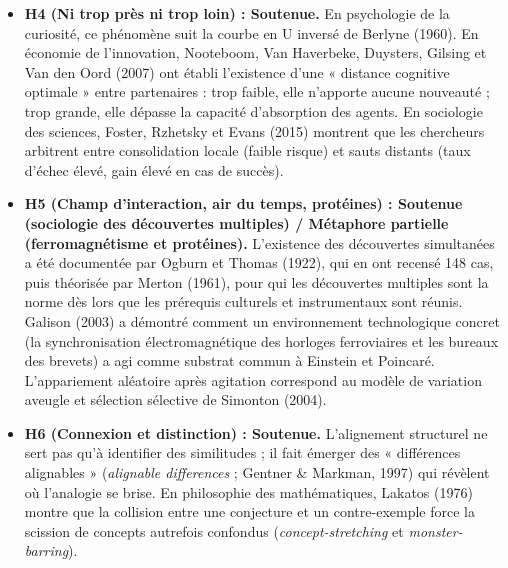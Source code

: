 \documentclass[a4paper,11pt]{article}
\begin{document}
\begin{itemize}
  l'invocation du théorème de Noether et d'un lagrangien est une
  métaphore non opératoire : le théorème de Noether relie les symétries
  continues (groupes de Lie) d'une fonctionnelle d'action différentiable
  \(\mathcal{S} = \int L(q, \dot{q}, t)\,dt\) à des courants conservés.
  Or, un réseau de concepts est discret, orienté et dépourvu de
  dynamique hamiltonienne ou lagrangienne canonique. L'équivalent
  mathématique rigoureux est l'\textbf{homomorphisme de graphes typés}
  (ou l'équivariance d'opérateurs discrets).
\item
  \textbf{H4 (Ni trop près ni trop loin) : Soutenue.} En psychologie de
  la curiosité, ce phénomène suit la courbe en U inversé de Berlyne
  (1960). En économie de l'innovation, Nooteboom, Van Haverbeke,
  Duysters, Gilsing et Van den Oord (2007) ont établi l'existence d'une
  « distance cognitive optimale » entre partenaires : trop faible, elle
  n'apporte aucune nouveauté ; trop grande, elle dépasse la capacité
  d'absorption des agents. En sociologie des sciences, Foster, Rzhetsky
  et Evans (2015) montrent que les chercheurs arbitrent entre
  consolidation locale (faible risque) et sauts distants (taux d'échec
  élevé, gain élevé en cas de succès).
\item
  \textbf{H5 (Champ d'interaction, air du temps, protéines) : Soutenue
  (sociologie des découvertes multiples) / Métaphore partielle
  (ferromagnétisme et protéines).} L'existence des découvertes
  simultanées a été documentée par Ogburn et Thomas (1922), qui en ont
  recensé 148 cas, puis théorisée par Merton (1961), pour qui les
  découvertes multiples sont la norme dès lors que les prérequis
  culturels et instrumentaux sont réunis. Galison (2003) a démontré
  comment un environnement technologique concret (la synchronisation
  électromagnétique des horloges ferroviaires et les bureaux des
  brevets) a agi comme substrat commun à Einstein et Poincaré.
  L'appariement aléatoire après agitation correspond au modèle de
  variation aveugle et sélection sélective de Simonton (2004).
\item
  \textbf{H6 (Connexion et distinction) : Soutenue.} L'alignement
  structurel ne sert pas qu'à identifier des similitudes ; il fait
  émerger des « différences alignables » (\emph{alignable differences} ;
  Gentner \& Markman, 1997) qui révèlent où l'analogie se brise. En
  philosophie des mathématiques, Lakatos (1976) montre que la collision
  entre une conjecture et un contre-exemple force la scission de
  concepts autrefois confondus (\emph{concept-stretching} et
  \emph{monster-barring}).

\end{itemize}
\end{document}
